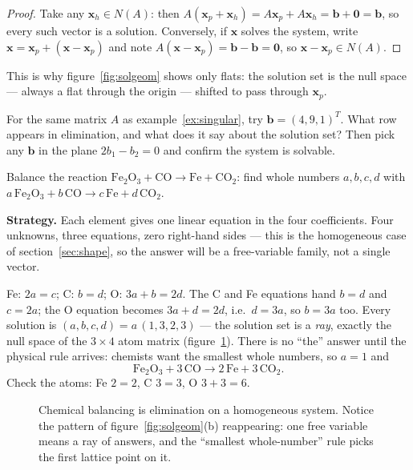 \begin{proof}
Take any $\mathbf{x}_h\in N(A)$: then $A(\mathbf{x}_p+\mathbf{x}_h)=A\mathbf{x}_p+A\mathbf{x}_h=\mathbf{b}+\mathbf{0}=\mathbf{b}$, so every such vector is a solution. Conversely, if $\mathbf{x}$ solves the system, write $\mathbf{x}=\mathbf{x}_p+(\mathbf{x}-\mathbf{x}_p)$ and note $A(\mathbf{x}-\mathbf{x}_p)=\mathbf{b}-\mathbf{b}=\mathbf{0}$, so $\mathbf{x}-\mathbf{x}_p\in N(A)$.
\end{proof}

This is why figure~\ref{fig:solgeom} shows only flats: the solution set is the null space — always a flat through the origin — shifted to pass through $\mathbf{x}_p$.

\begin{exercise}[medium]
For the same matrix $A$ as example~\ref{ex:singular}, try $\mathbf{b}=(4,9,1)^{T}$. What row appears in elimination, and what does it say about the solution set? Then pick any $\mathbf{b}$ in the plane $2b_1-b_2=0$ and confirm the system is solvable.
\end{exercise}

\begin{example}\label{ex:balance}
Balance the reaction $\mathrm{Fe}_2\mathrm{O}_3 + \mathrm{CO} \to \mathrm{Fe} + \mathrm{CO}_2$:
find whole numbers $a,b,c,d$ with
$a\,\mathrm{Fe}_2\mathrm{O}_3 + b\,\mathrm{CO} \to c\,\mathrm{Fe} + d\,\mathrm{CO}_2$.
\par\smallskip
\textbf{Strategy.} Each element gives one linear equation in the four
coefficients. Four unknowns, three equations, zero right-hand sides ---
this is the homogeneous case of section~\ref{sec:shape}, so the answer
will be a free-variable family, not a single vector.
\begin{solution}
Fe: $2a=c$; C: $b=d$; O: $3a+b=2d$. The C and Fe equations hand $b=d$
and $c=2a$; the O equation becomes $3a+d=2d$, i.e.\ $d=3a$, so
$b=3a$ too. Every solution is $(a,b,c,d)=a\,(1,3,2,3)$ --- the solution
set is a \emph{ray}, exactly the null space of the $3\times4$ atom
matrix (figure~\ref{fig:balance}). There is no ``the'' answer until the
physical rule arrives: chemists want the smallest whole numbers, so
$a=1$ and
\[
  \mathrm{Fe}_2\mathrm{O}_3 + 3\,\mathrm{CO} \longrightarrow 2\,\mathrm{Fe} + 3\,\mathrm{CO}_2.
\]
Check the atoms: Fe $2=2$, C $3=3$, O $3+3=6$. \checkmark
\end{solution}
\end{example}

\begin{figure}[ht]\centering

\caption{Chemical balancing is elimination on a homogeneous system.
Notice the pattern of figure~\ref{fig:solgeom}(b) reappearing: one free
variable means a ray of answers, and the ``smallest whole-number'' rule
picks the first lattice point on it.}
\label{fig:balance}
\end{figure}

